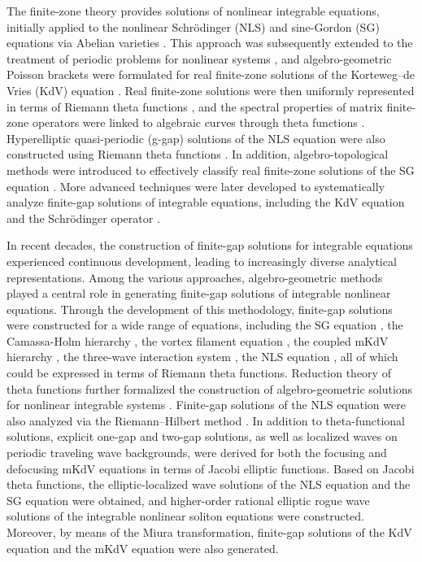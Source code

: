 \documentclass[11pt,reqno]{amsart}
\numberwithin{equation}{section}
\begin{document}
The finite-zone theory provides solutions of nonlinear integrable equations, initially applied to the nonlinear Schr\"odinger (NLS) and sine-Gordon (SG) equations via Abelian varieties \cite{DubrovinMN-1976}.
This approach was subsequently extended to the treatment of periodic  problems for nonlinear systems \cite{Dubrovin-1977}, and algebro-geometric Poisson brackets were formulated for real finite-zone solutions of the Korteweg–de Vries (KdV) equation \cite{VeselovN-1982}.
Real finite-zone solutions were then uniformly represented in
terms of Riemann theta functions \cite{DubrovinN-1982},
and the spectral properties of matrix finite-zone operators were linked to algebraic curves through theta functions \cite{Dubrovin-1983}.
Hyperelliptic quasi-periodic (g-gap) solutions of the NLS equation were also constructed using Riemann theta functions \cite{PreviatoE-1985-NLS}. 
In addition, algebro-topological methods were introduced to effectively classify real finite-zone solutions of the SG equation \cite{Novikov-1985}.
More advanced techniques were later developed to systematically analyze finite-gap solutions of integrable equations, including the KdV equation \cite{BelokolosBME-1986} and the Schr\"{o}dinger operator \cite{BelokolosE-1994}.

In recent decades, the construction of finite-gap solutions for integrable equations experienced continuous development, leading to increasingly diverse analytical representations.
Among the various approaches, algebro-geometric methods played a central role in generating finite-gap solutions of integrable nonlinear equations.
Through the development of this methodology, finite-gap solutions were constructed for a wide range of equations, including the SG equation \cite{GrinevichN-2003}, the Camassa-Holm hierarchy \cite{Qiao-03}, the vortex filament equation \cite{CaliniI-05-VFE}, the coupled mKdV hierarchy \cite{GengZD-2014}, the three-wave interaction system \cite{HeGW-2014}, the NLS equation \cite{Wright-16,Wright-19,Wright-2017}, all of which could be expressed in terms of Riemann theta functions.
Reduction theory of theta functions further formalized the construction of algebro-geometric solutions for nonlinear integrable systems \cite{BelokolosE-2001,BelokolosE-2002}.
Finite-gap solutions of the NLS equation were also analyzed via the Riemann–Hilbert method \cite{BertolaT-2017}.
In addition to theta-functional solutions, explicit one-gap and two-gap solutions, as well as localized waves on periodic traveling wave backgrounds, were derived for both the focusing \cite{ChenPW-19,Chen-19-mKdV} and defocusing mKdV equations \cite{ArrudaP-2025} in terms of Jacobi elliptic functions. 
Based on Jacobi theta functions, the elliptic-localized wave solutions of the NLS equation \cite{FengLT-20} and the SG equation \cite{LingS-22-SG} were obtained, and higher-order rational elliptic rogue wave solutions of the integrable nonlinear soliton equations \cite{LingS-24-RW} were constructed.
Moreover, by means of the Miura transformation, finite-gap solutions of the KdV equation and the mKdV equation \cite{SmirnovA-24} were also generated.
\end{document}
